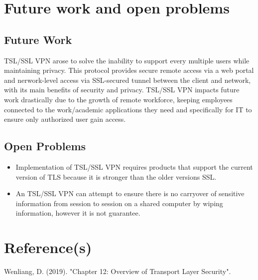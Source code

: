 \documentclass[12pt]{article}
\begin{document}
\section{Future work and open problems}
\subsection{Future Work}
TSL/SSL VPN arose to solve the inability to support every multiple users while maintaining privacy. This protocol provides secure remote access via a web portal and nerwork-level access via SSL-secured tunnel between the client and network, with its main benefits of security and privacy. TSL/SSL VPN impacts future work drastically due to the growth of remote workforce, keeping employees connected to the work/academic applications they need and specifically for IT to ensure only authorized user gain access. 
\subsection{Open Problems}
\begin{itemize}
\item Implementation of TSL/SSL VPN requires products that support the current version of TLS because it is stronger than the older versions SSL. 
\end{itemize}
\begin{itemize}
\item An TSL/SSL VPN can attempt to ensure there is no carryover of sensitive information from session to session on a shared computer by wiping information, however it is not guarantee.
\end{itemize}


\section{Reference(s)}
\item Wenliang, D. (2019). "Chapter 12: Overview of Transport Layer Security".
\item 
\end{document}

